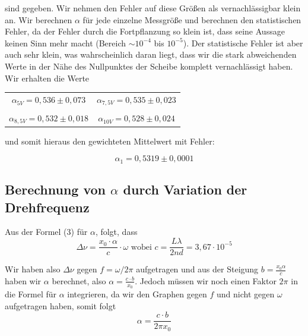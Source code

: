 sind gegeben. Wir nehmen den Fehler auf diese Größen als vernachlässigbar klein an. Wir berechnen $\alpha$ für jede einzelne Messgröße und berechnen den statistischen Fehler, da der Fehler durch die Fortpflanzung so klein ist, dass seine Aussage keinen Sinn mehr macht (Bereich $\sim 10^{-4}$  bis  $10^{-5}$). Der statistische Fehler ist aber auch sehr klein, was wahrscheinlich daran liegt, dass wir die stark abweichenden Werte in der Nähe des Nullpunktes der Scheibe komplett vernachlässigt haben. Wir erhalten die Werte

\begin{center}
\begin{tabular}[H]{c c}
	$\alpha_{5V} = 0,536 \pm 0,073$ & $\alpha_{7,5V} = 0,535 \pm 0,023$\\
	 & \\
	$\alpha_{8,5V} = 0,532 \pm 0,018$ & $\alpha_{10V} = 0,528 \pm 0,024$
\end{tabular}
\end{center}

und somit hieraus den gewichteten Mittelwert mit Fehler:

$$\boxed{\alpha_1 =0,5319 \pm 0,0001}$$

\clearpage

\subsection{Berechnung von $\alpha$ durch Variation der Drehfrequenz}

Aus der Formel (3) für $\alpha$, folgt, dass $$\Delta\nu = \frac{x_0\cdot\alpha}{c}\cdot\omega \text{\ \ wobei \ \ }
c = \frac{L\lambda}{2nd} = 3,67\cdot 10^{-5}$$

Wir haben also $\Delta\nu$ gegen $f=\omega/2\pi$ aufgetragen und aus der Steigung $b=\frac{x_0\alpha}{c}$ haben wir $\alpha$ berechnet, also $\alpha=\frac{c\cdot b}{x_0}$. Jedoch müssen wir noch einen Faktor $2\pi$ in die Formel für $\alpha$ integrieren, da wir den Graphen gegen $f$ und nicht gegen $\omega$ aufgetragen haben, somit folgt $$\alpha = \frac{c\cdot b}{2\pi x_0}$$

